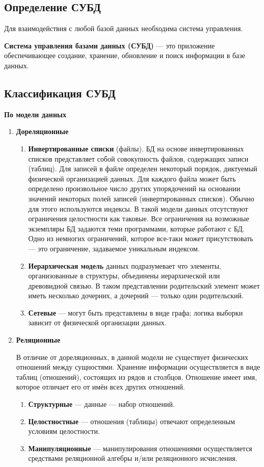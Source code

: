 \subsection{Определение СУБД}

Для взаимодействия с любой базой данных необходима система управления.

\textbf{Система управления базами данных (СУБД)} --- это приложение обеспечивающее создание, хранение, обновление и поиск информации в базе данных.

\subsection{Классификация СУБД}

\textbf{По модели данных}

\begin{enumerate}[label=\arabic*.]
	\item \textbf{Дореляционные}
	\begin{enumerate}[label=\alph*.]
		\item \textbf{Инвертированные списки} (файлы). БД на основе инвертированных списков представляет собой совокупность файлов, содержащих записи (таблиц). Для записей в файле определен некоторый порядок, диктуемый физической организацией данных. Для каждого файла может быть определено произвольное число других упорядочений на основании значений некоторых полей записей (инвертированных списков). Обычно для этого используются индексы. В такой модели данных отсутствуют ограничения целостности как таковые. Все ограничения на возможные экземпляры БД задаются теми программами, которые работают с БД. Одно из немногих ограничений, которое все-таки может присутствовать --- это ограничение, задаваемое уникальным индексом. 
		\item \textbf{Иерархическая модель} данных подразумевает что элементы, организованные в структуры, объединены иерархической или древовидной связью. В таком представлении родительский элемент может иметь несколько дочерних, а дочерний --- только один родительский.
		\item \textbf{Сетевые} --- могут быть представлены в виде графа; логика выборки зависит от физической организации данных.
	\end{enumerate}
	\item \textbf{Реляционные}
	
	В отличие от дореляционных, в данной модели не существует физических отношений между сущностями. Хранение информации осуществляется в виде таблиц (отношений), состоящих из рядов и столбцов.  Отношение имеет имя, которое отличает его от имён всех других отношений.
	\begin{enumerate}[label=\alph*.]
		\item \textbf{Структурные} --- данные --- набор отношений.
		\item \textbf{Целостностные} --- отношения (таблицы) отвечают определенным условиям целостности.
		\item \textbf{Манипуляционные} --- манипулирования отношениями осуществляется средствами реляционной алгебры и/или реляционного исчисления.
	\end{enumerate}


\end{enumerate}

